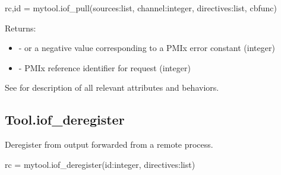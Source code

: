 \format

\pyspecificstart
\begin{codepar}
rc,id = mytool.iof_pull(sources:list, channel:integer,
                        directives:list, cbfunc)
\end{codepar}
\pyspecificend

\begin{arglist}
\end{arglist}

Returns:

\begin{itemize}
    \item {} -  or a negative value corresponding to a PMIx error constant (integer)
    \item {} - \ac{PMIx} reference identifier for request (integer)
\end{itemize}

See  for description of all relevant attributes and behaviors.


\subsection{Tool.iof_deregister}

\summary

Deregister from output forwarded from a remote process.

\format

\pyspecificstart
\begin{codepar}
rc = mytool.iof_deregister(id:integer, directives:list)
\end{codepar}
\pyspecificend

\begin{arglist}
\end{arglist}

